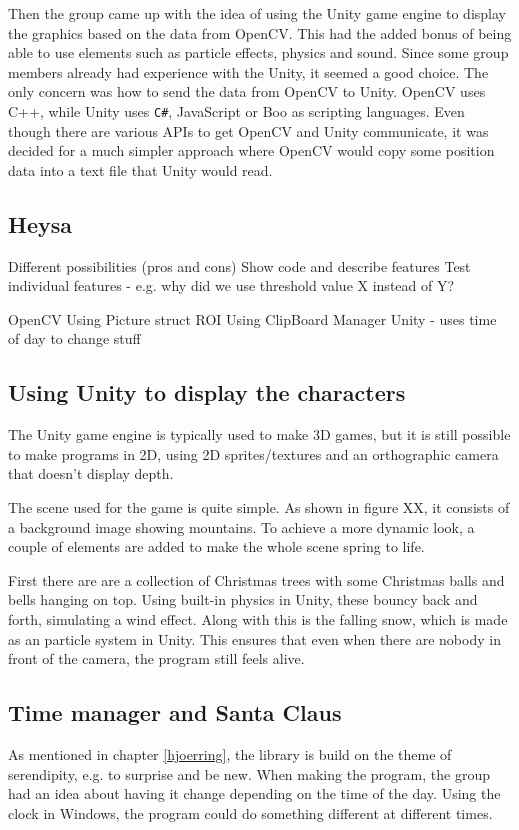 {Then the group came up with the idea of using the Unity game engine to display the graphics based on the data from OpenCV. This had the added bonus of being able to use elements such as particle effects, physics and sound. Since some group members already had experience with the Unity, it seemed a good choice. The only concern was how to send the data from OpenCV to Unity. OpenCV uses C++, while Unity uses \texttt{C\#}, JavaScript or Boo as scripting languages. Even though there are various APIs to get OpenCV and Unity communicate, it was decided for a much simpler approach where OpenCV would copy some position data into a text file that Unity would read.


\subsection{Heysa}
Different possibilities (pros and cons)
Show code and describe features
Test individual features - e.g. why did we use threshold value X instead of Y?

OpenCV
Using Picture struct
ROI
Using ClipBoard Manager
Unity - uses time of day to change stuff

\subsection{Using Unity to display the characters}
The Unity game engine is typically used to make 3D games, but it is still possible to make programs in 2D, using 2D sprites/textures and an orthographic camera that doesn't display depth.

The scene used for the game is quite simple. As shown in figure XX, it consists of a background image showing mountains. To achieve a more dynamic look, a couple of elements are added to make the whole scene spring to life.

First there are are a collection of Christmas trees with some Christmas balls and bells hanging on top. Using built-in physics in Unity, these bouncy back and forth, simulating a wind effect. Along with this is the falling snow, which is made as an particle system in Unity. This ensures that even when there are nobody in front of the camera, the program still feels alive.

\subsection{Time manager and Santa Claus}
As mentioned in chapter \ref{hjoerring}, the library is build on the theme of serendipity, e.g. to surprise and be new. When making the program, the group had an idea about having it change depending on the time of the day. Using the clock in Windows, the program could do something different at different times.

}
